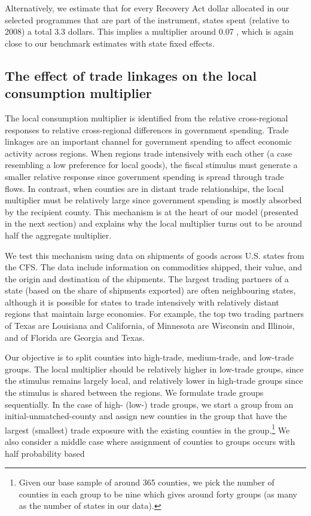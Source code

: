 \documentclass[\latexroot/\projectname]{subfiles}
\begin{document}
Alternatively, we estimate that for every Recovery Act dollar allocated in our selected programmes that are part of the instrument, states spent (relative to 2008) a total 3.3 dollars. This implies a multiplier around 0.07 , which is again close to our benchmark estimates with state fixed effects.

\subsection{The effect of trade linkages on the local consumption multiplier}
The local consumption multiplier is identified from the relative cross-regional responses to relative cross-regional differences in government spending. Trade linkages are an important channel for government spending to affect economic activity across regions. When regions trade intensively with each other (a case resembling a low preference for local goods), the fiscal stimulus must generate a smaller relative response since government spending is spread through trade flows. In contrast, when counties are in distant trade relationships, the local multiplier must be relatively large since government spending is mostly absorbed by the recipient county. This mechanism is at the heart of our model (presented in the next section) and explains why the local multiplier turns out to be around half the aggregate multiplier.

We test this mechanism using data on shipments of goods across U.S. states from the CFS. The data include information on commodities shipped, their value, and the origin and destination of the shipments. The largest trading partners of a state (based on the share of shipments exported) are often neighbouring states, although it is possible for states to trade intensively with relatively distant regions that maintain large economies. For example, the top two trading partners of Texas are Louisiana and California, of Minnesota are Wisconsin and Illinois, and of Florida are Georgia and Texas.

Our objective is to split counties into high-trade, medium-trade, and low-trade groups. The local multiplier should be relatively higher in low-trade groups, since the stimulus remains largely local, and relatively lower in high-trade groups since the stimulus is shared between the regions. We formulate trade groups sequentially. In the case of high- (low-) trade groups, we start a group from an initial-unmatched-county and assign new counties in the group that have the largest (smallest) trade exposure with the existing counties in the group.\footnote{Given our base sample of around 365 counties, we pick the number of counties in each group to be nine which gives around forty groups (as many as the number of states in our data).} We also consider a middle case where assignment of counties to groups occurs with half probability based
\end{document}
